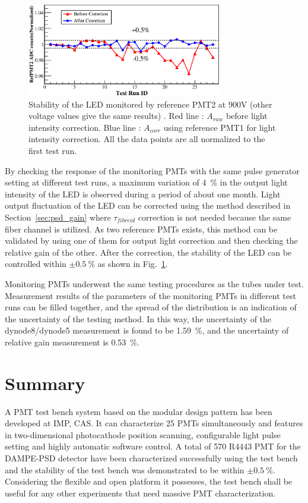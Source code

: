 \documentclass{nst}
\providecommand{\DIFadd}[1]{{\protect\color{yellow} #1}} %
\providecommand{\DIFaddbegin}{} %
\providecommand{\DIFaddend}{} %
\providecommand{\DIFdelbegin}{} %
\providecommand{\DIFdelend}{} %
\begin{document}
\begin{figure}[!htb]
	\centering
	\includegraphics[width=85mm]{FIG10}
	\caption{Stability of the LED monitored by reference PMT2 at 900V (other voltage values give the same results) . Red line : $A_{raw}$ before light intensity correction. Blue line : $A_{corr}$ using reference PMT1 for light intensity correction. All the data points are all normalized to the first test run.}
	\label{fig:FIG10}
\end{figure} 

By checking the response of the monitoring PMTs with the same pulse generator setting at different test runs, a maximum variation of \SI{4}{\percent} in the output light intensity of the LED is observed during a period of about one month.
Light output fluctuation of the LED can be corrected using the method described in Section~\ref{sec:psd_gain} where $\tau_{fibreid}$ correction is not needed because the same fiber channel is utilized.
As two reference PMTs exists, this method can be validated by using one of them for output light correction and then checking the relative gain of the other. 
After the correction, the stability of the LED can be controlled within $\pm\SI{0.5}{\percent}$ as shown in Fig.~\ref{fig:FIG10}.

Monitoring PMTs underwent the same testing procedures as the tubes under test.
Measurement results of the parameters of the monitoring PMTs in different test runs can be filled together, and the spread of the distribution is an indication of the uncertainty of the testing method.
In this way, the uncertainty of the dynode8/dynode5 measurement is found to be \SI{1.59}{\percent}, and the uncertainty of relative gain measurement is \SI{0.53}{\percent}. 

\section{Summary}
\label{sec:summary}
A \DIFdelbegin \DIFdelend PMT test bench system \DIFaddbegin \DIFadd{based on the modular design pattern }\DIFaddend has been developed at IMP, CAS.
It \DIFdelbegin \DIFdelend \DIFaddbegin \DIFadd{can characterize 25 PMTs simultaneously and features in two-dimensional photocathode position scanning, configurable light pulse setting and highly automatic software control. A total of 570 R4443 PMT for the DAMPE-PSD detector have been characterized successfully using the test bench and the stability of the test bench was demonstrated to be within $\pm\SI{0.5}{\percent}$}\DIFaddend .
Considering the flexible and open platform it possesses, the test bench \DIFdelbegin \DIFdelend \DIFaddbegin \DIFadd{shall be }\DIFaddend useful for any other \DIFdelbegin \DIFdelend \DIFaddbegin \DIFadd{experiments }\DIFaddend that need massive PMT characterization. 
\end{document}
